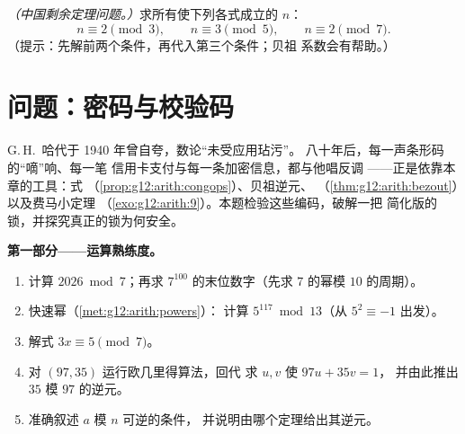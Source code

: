 \begin{exercise}[$\star\star\star$]\label{exo:g12:arith:10}
\emph{（中国剩余定理问题。）}求所有使下列各式成立的 $n$：
\[
n \equiv 2 \pmod 3, \qquad n \equiv 3 \pmod 5, \qquad n \equiv 2 \pmod 7 .
\]
（提示：先解前两个条件，再代入第三个条件；贝祖
系数会有帮助。）
\end{exercise}

\section{问题：密码与校验码}

\begin{problem}
\label{pb:g12:arith:1}
G.\,H.~哈代于 1940 年曾自夸，数论“未受应用玷污”。
八十年后，每一声条形码的“嘀”响、每一笔
信用卡支付与每一条加密信息，都与他唱反调
——正是依靠本章的工具：式
（\cref{prop:g12:arith:congops}）、贝祖逆元、
（\cref{thm:g12:arith:bezout}）以及费马小定理
（\cref{exo:g12:arith:9}）。本题检验这些编码，破解一把
简化版的锁，并探究真正的锁为何安全。

\medskip
\noindent\textbf{第一部分——运算熟练度。}
\begin{enumerate}
  \item 计算 $2026 \bmod 7$；再求
        $7^{100}$ 的末位数字（先求 $7$ 的幂模
        $10$ 的周期）。
  \item 快速幂（\cref{met:g12:arith:powers}）：
        计算 $5^{117} \bmod 13$（从
        $5^2 \equiv -1$ 出发）。
  \item 解式 $3x \equiv 5 \pmod 7$。
  \item 对 $(97, 35)$ 运行欧几里得算法，回代
        求 $u, v$ 使 $97u + 35v = 1$，
        并由此推出 $35$ 模 $97$ 的逆元。
  \item 准确叙述 $a$ 模 $n$ 可逆的条件，
        并说明由哪个定理给出其逆元。
\end{enumerate}


\end{problem}
